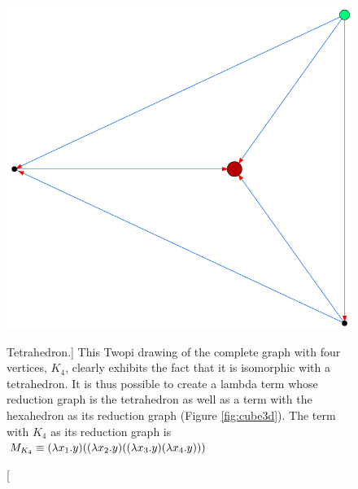 \begin{figure}[htbp]
	\centering
		\includegraphics[height=\exampleheight]{../images/Tetraeder_TWOPI.png}
	\caption
	[Tetrahedron.]
	{This Twopi drawing of the complete graph with four vertices, $K_4$,
	clearly exhibits the fact that it is isomorphic with a tetrahedron. It is
	thus possible to create a lambda term whose reduction graph is the tetrahedron
	as well as a term with the hexahedron as its reduction graph (Figure \ref{fig:cube3d}).
	The term with $K_4$ as its reduction graph is $M_{K_4}\equiv(\lambda x_1.y) ((\lambda x_2.y) ((\lambda x_3.y) (\lambda x_4.y)))$}
	\label{fig:images_Tetraeder_TWOPI}
\end{figure}


